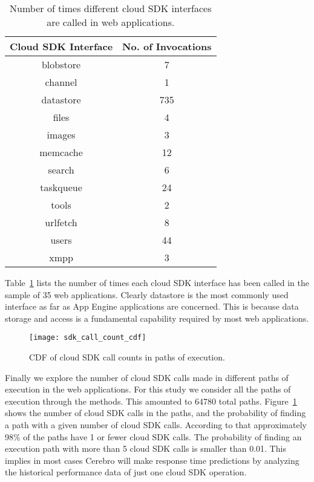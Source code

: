 \begin{table}[htdp]
\caption{Number of times different cloud SDK interfaces are called in web applications.}
\begin{center}
\begin{tabular}{|c|c|}
\hline
Cloud SDK Interface & No. of Invocations \\ \hline
blobstore & 7 \\ \hline
channel & 1 \\ \hline
datastore & 735 \\ \hline
files & 4 \\ \hline
images & 3 \\ \hline
memcache & 12 \\ \hline
search & 6 \\ \hline
taskqueue & 24 \\ \hline
tools & 2 \\ \hline
urlfetch & 8 \\ \hline
users & 44 \\ \hline
xmpp & 3 \\ \hline
\end{tabular}
\end{center}
\label{tab:sdk_call_counts}
\end{table}

Table~\ref{tab:sdk_call_counts} lists the number of times each cloud SDK interface has been called in the sample of
35 web applications. Clearly datastore is the most commonly used interface as far as App Engine applications are 
concerned. This is because data storage and access is a fundamental capability required by most web applications. 

\begin{figure}
\centering
\texttt{[image: sdk\_call\_count\_cdf]}
\caption{CDF of cloud SDK call counts in paths of execution.}
\label{fig:sdk_call_count_cdf}
\end{figure}

Finally we explore the number of cloud SDK calls made in different paths of execution in the web applications. For this study
we consider all the paths of execution through the methods. This amounted to 64780 total paths. Figure~\ref{fig:sdk_call_count_cdf}
shows the number of cloud SDK calls in the paths, and the probability of finding a path with a given number of cloud SDK calls.
According to that approximately 98\% of the paths have 1 or fewer cloud SDK calls. The probability of finding an execution path with more than
5 cloud SDK calls is smaller than 0.01. This implies in most cases Cerebro will make response time predictions by analyzing the
historical performance data of just one cloud SDK operation.